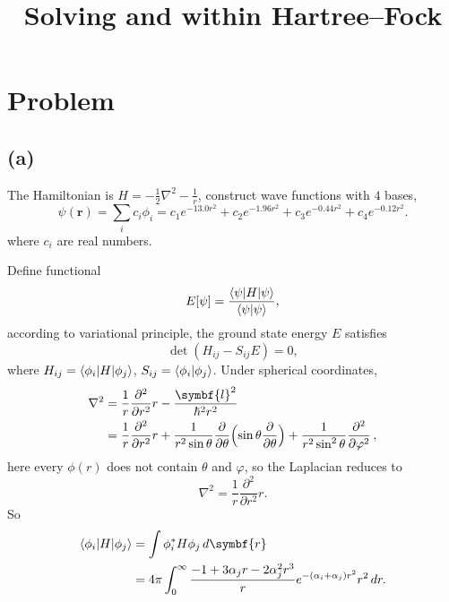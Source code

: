 \documentclass[12pt]{article}
\title{Solving \ce{He} and \ce{H2} within Hartree--Fock}
\author{}
\date{}
\newcommand*{\RMN}[1]{\uppercase\expandafter{\romannumeral#1}}
\begin{document}
\section{Problem \RMN{1}}

\subsection*{(a)}

The Hamiltonian is $H = -\frac{1}{2} \nabla^2 - \frac{1}{r}$,
construct wave functions with $4$ bases,
%
\begin{equation}
    \psi(\symbf{r}) = \sum_{i} c_i \phi_i = c_1 e^{-13.0 r^2} +
    c_2 e^{-1.96 r^2} + c_3 e^{-0.44 r^2} + c_4 e^{-0.12 r^2}.
\end{equation}
%
where $c_i$ are real numbers.

Define functional
%
\begin{equation}
    E[\psi] = \frac{\braket{\psi| H | \psi}}{\braket{\psi|\psi}},
\end{equation}
%
according to variational principle, the ground state energy $E$ satisfies
%
\begin{equation}
    \det (H_{ij} - S_{ij} E) = 0,
\end{equation}
%
where $H_{ij} = \braket{\phi_i | H | \phi_j}$, $S_{ij} = \braket{\phi_i | \phi_j}$.
Under spherical coordinates,
%
\begin{equation}
    \begin{aligned}
        \nabla^2 & = \frac{1}{r} \frac{\partial^2}{\partial r^2} r - \frac{\symbf{l}^2}{\hbar^2 r^2} \\
                 & = \frac{1}{r} \frac{\partial^2}{\partial r^2}r +
        \frac{1}{r^{2}\sin \theta} \frac{\partial}{\partial \theta}
        \Bigl(\sin \theta{\frac{\partial}{\partial \theta}}\Bigr)+
        \frac{1}{r^{2}\sin^{2}\theta} \frac{\partial^{2}}{\partial \varphi^{2}} \,,
    \end{aligned}
\end{equation}
%
here every $\phi(r)$ does not contain $\theta$ and $\varphi$, so the Laplacian reduces to
%
\begin{equation}
    \nabla^2 = \frac{1}{r} \frac{\partial^2}{\partial r^2} r.
\end{equation}
%
So
%
\begin{equation}
    \begin{aligned}
        \braket{\phi_i | H | \phi_j} & = \int \phi_i^\ast H \phi_j \, d\symbf{r}                              \\
                                     & = 4\pi\int_{0}^{\infty} \frac{-1 + 3 \alpha_j r - 2 \alpha_j^2 r^3}{r}
        e^{-(\alpha_i + \alpha_j)r^2} r^2\, dr.
    \end{aligned}
\end{equation}
\end{document}
